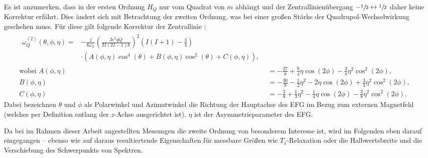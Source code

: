 Es ist anzumerken, dass in der ersten Ordnung $H_Q$ nur vom Quadrat von $m$ abhängt und der Zentrallinienübergang $-\sfrac{1}{2} \leftrightarrow \sfrac{1}{2}$ daher keine Korrektur erfährt. Dies ändert sich mit Betrachtung der zweiten Ordnung, was bei einer großen Stärke der Quadrupol-Wechselwirkung geschehen muss. Für diese gilt folgende Korrektur der Zentrallinie \cite{man_quadrupole_2000}:
\begin{align}
    \begin{split}
        \omega_Q^{(2)} \left( \theta, \phi, \eta \right) =& - \frac{1}{6 \omega_L} \left(\frac{3 e^2 q Q}{2 I \left(2 I - 1 \right) \hbar}\right)^2 \left( I \left(I + 1 \right) - \frac{3}{4} \right) \\
		& \cdot \left( A \left(\phi, \eta \right) \cos^4 \left( \theta \right) + B \left(\phi, \eta \right) \cos^2 \left( \theta \right) + C \left(\phi, \eta \right) \right), \label{eqn:theo:omega2}
    \end{split}\\
    \text{wobei}\,\, A \left( \phi, \eta \right) &= -\frac{27}{8} + \frac{9}{4} \eta \cos \left(2 \phi \right) - \frac{3}{8} \eta^2 \cos^2 \left(2 \phi \right), \\
    B \left( \phi, \eta \right) &= -\frac{30}{8} - \frac{1}{2} \eta^2 - 2\eta \cos \left(2 \phi \right) + \frac{3}{4} \eta^2 \cos^2 \left(2 \phi \right), \\
    C \left( \phi, \eta \right) &= -\frac{3}{8} + \frac{1}{3} \eta^2 - \frac{1}{4} \eta \cos \left(2 \phi \right) - \frac{3}{8} \eta^2 \cos^2 \left(2 \phi \right).
\end{align}
Dabei bezeichnen $\theta$ und $\phi$ als Polarwinkel und Azimutwinkel die Richtung der Hauptachse des EFG im Bezug zum externen Magnetfeld (welches per Definition entlang der $z$-Achse ausgerichtet ist). $\eta$ ist der Asymmetrieparameter des EFG.


\par\bigskip

Da bei im Rahmen dieser Arbeit angestellten Messungen die zweite Ordnung von besonderem Interesse ist, wird im Folgenden eben darauf eingegangen -- ebenso wie auf daraus resultiertende Eigenschaften für messbare Größen wie $T_1$-Relaxation oder die Halbwertsbreite und die Verschiebung des Schwerpunkts von Spektren.

